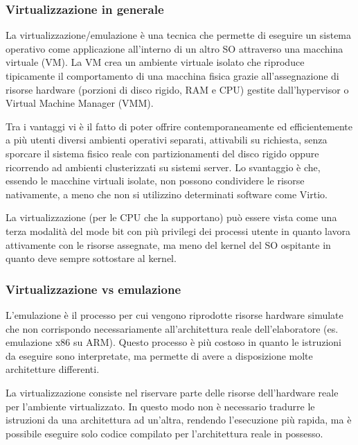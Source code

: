 \documentclass[a4paper]{article}
\begin{document}
\subsubsection*{Virtualizzazione in generale}
La virtualizzazione/emulazione è una tecnica che permette di eseguire un sistema operativo come applicazione all’interno di un
altro SO attraverso una macchina virtuale (VM). La VM crea un ambiente virtuale isolato che riproduce tipicamente il comportamento
di una macchina fisica grazie all'assegnazione di risorse hardware (porzioni di disco rigido, RAM e CPU) gestite dall'hypervisor
o Virtual Machine Manager (VMM).

Tra i vantaggi vi è il fatto di poter offrire contemporaneamente ed efficientemente a più utenti diversi ambienti operativi
separati, attivabili su richiesta, senza sporcare il sistema fisico reale con partizionamenti del disco rigido oppure ricorrendo
ad ambienti clusterizzati su sistemi server. Lo svantaggio è che, essendo le macchine virtuali isolate, non possono condividere
le risorse nativamente, a meno che non si utilizzino determinati software come Virtio.

La virtualizzazione (per le CPU che la supportano) può essere vista come una terza modalità del mode bit con più privilegi dei
processi utente in quanto lavora attivamente con le risorse assegnate, ma meno del kernel del SO ospitante in quanto deve
sempre sottostare al kernel.

\subsubsection*{Virtualizzazione vs emulazione}
L'emulazione è il processo per cui vengono riprodotte risorse hardware simulate che non corrispondo necessariamente
all'architettura reale dell'elaboratore (es. emulazione x86 su ARM). Questo processo è più costoso in quanto le istruzioni
da eseguire sono interpretate, ma permette di avere a disposizione molte architetture differenti.

La virtualizzazione consiste nel riservare parte delle risorse dell'hardware reale per l'ambiente virtualizzato. In questo modo
non è necessario tradurre le istruzioni da una architettura ad un'altra, rendendo l'esecuzione più rapida, ma è possibile eseguire
solo codice compilato per l'architettura reale in possesso.

\newpage


\end{document}
